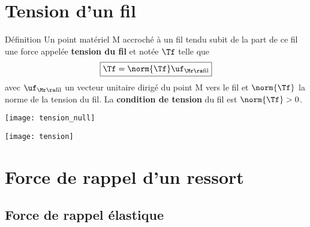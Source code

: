 \documentclass[../main/main.tex]{subfiles}
\begin{document}
\section{Tension d'un fil}
\begin{tdefi}{Définition}
    Un point matériel M accroché à un fil tendu subit de la part de ce fil une
    force appelée \textbf{tension du fil} et notée $\Tf$ telle que
    \[\boxed{\Tf = \norm{\Tf}\uf_{\Mr\ra\rm fil}}\]
    avec $\uf_{\Mr\ra\rm fil}$ un vecteur unitaire dirigé du point M vers le fil
    et $\norm{\Tf}$ la norme de la tension du fil. La \textbf{condition de
    tension} du fil est $\norm{\Tf} > 0$.

    \begin{minipage}{0.45\linewidth}
        \begin{center}
            \texttt{[image: tension\_null]}
        \end{center}
    \end{minipage}
    \hfill
    \begin{minipage}{0.45\linewidth}
        \begin{center}
            \texttt{[image: tension]}%
        \end{center}
    \end{minipage}
\end{tdefi}

\section{Force de rappel d'un ressort}
\subsection{Force de rappel élastique}
\end{document}
